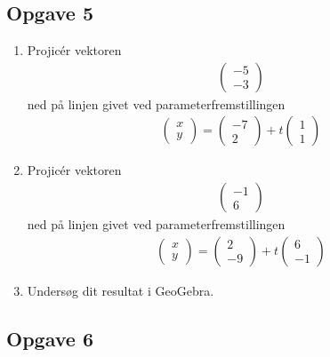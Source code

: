 \subsection*{Opgave 5}

\begin{enumerate}[label=\roman*)]
	\item Projicér vektoren 
	\begin{align*}
		\begin{pmatrix}
			-5 \\ -3
		\end{pmatrix}
	\end{align*}
	ned på linjen givet ved parameterfremstillingen
	\begin{align*}
		\begin{pmatrix}
			x \\ y
		\end{pmatrix} = 
		\begin{pmatrix}
			-7 \\ 2
		\end{pmatrix} + t
		\begin{pmatrix}
			1 \\ 1
		\end{pmatrix}
	\end{align*}
	\item Projicér vektoren 
	\begin{align*}
		\begin{pmatrix}
			-1 \\ 6
		\end{pmatrix}
	\end{align*}
	ned på linjen givet ved parameterfremstillingen
	\begin{align*}
		\begin{pmatrix}
			x \\ y
		\end{pmatrix} = 
		\begin{pmatrix}
			2 \\ -9
		\end{pmatrix} + t
		\begin{pmatrix}
			6 \\ -1
		\end{pmatrix}
	\end{align*}
	\item Undersøg dit resultat i GeoGebra.
\end{enumerate}

\subsection*{Opgave 6}

